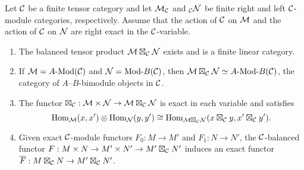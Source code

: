 \documentclass{amsart}
\begin{document}
\begin{theorem} \label{thm:DelignePrdtOverATCExists}
	Let $\mathcal C$ be a finite tensor category and let $\mathcal M_{\mathcal C}$ and ${}_{\mathcal C}\mathcal N$ be finite right and left $\mathcal C$-module categories, respectively. Assume that the action of $\mathcal C$ on $\mathcal M$ and the action of $\mathcal C$ on $\mathcal N$ are right exact in the $\mathcal C$-variable.
	\begin{enumerate}
		\item The balanced tensor product $\mathcal M \boxtimes_{\mathcal C} \mathcal N$ exists and is a finite linear category.
		\item If $\cM = \Mod{A}{}(\cC)$ and $\cN = \Mod{}{B}(\cC)$, then $\cM \boxtimes_{\cC} \cN \simeq \Mod{A }{B}(\cC)$, the category of $A$--$B$-bimodule objects in $\mathcal C$.

		\item The functor $\boxtimes_{\mathcal C}: \mathcal M \times \mathcal N \to \mathcal M \boxtimes_{\mathcal C} \mathcal N$ is exact in each variable and satisfies 
		\begin{equation*}
			\operatorname{Hom}_{\mathcal M}(x,x') \otimes \operatorname{Hom}_{\mathcal N}(y, y') \cong \operatorname{Hom}_{\mathcal M \boxtimes_{\mathcal C} \mathcal N} (x \boxtimes_{\mathcal C} y, x' \boxtimes_{\mathcal C} y').
		\end{equation*}
		\item Given exact $\mathcal C$-module functors $F_0: M \to M'$ and $F_1: N \to N'$, the $\mathcal C$-balanced functor $F: M \times N \to M' \times N' \to M' \boxtimes_{\mathcal C} N'$ induces an exact functor $\overline{F}: M \boxtimes_{\mathcal C} N \to M' \boxtimes_{\mathcal C} N'$.
	\end{enumerate} 
\end{theorem}
\end{document}
